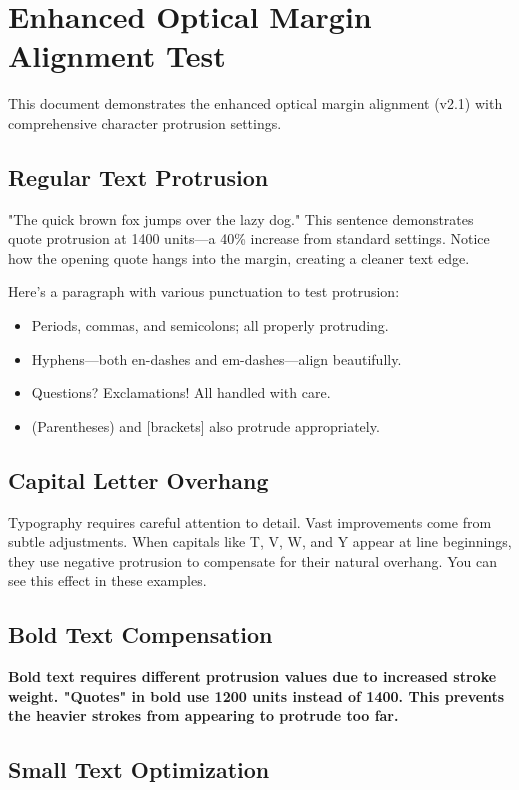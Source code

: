 \documentclass{article}
\begin{document}
\section{Enhanced Optical Margin Alignment Test}

This document demonstrates the enhanced optical margin alignment (v2.1) with comprehensive character protrusion settings.

\subsection{Regular Text Protrusion}

"The quick brown fox jumps over the lazy dog." This sentence demonstrates quote protrusion at 1400 units---a 40\% increase from standard settings. Notice how the opening quote hangs into the margin, creating a cleaner text edge.

Here's a paragraph with various punctuation to test protrusion:
\begin{itemize}
\item Periods, commas, and semicolons; all properly protruding.
\item Hyphens---both en-dashes and em-dashes---align beautifully.
\item Questions? Exclamations! All handled with care.
\item (Parentheses) and [brackets] also protrude appropriately.
\end{itemize}

\subsection{Capital Letter Overhang}

Typography requires careful attention to detail. Vast improvements come from subtle adjustments. When capitals like T, V, W, and Y appear at line beginnings, they use negative protrusion to compensate for their natural overhang. You can see this effect in these examples.

\subsection{Bold Text Compensation}

\textbf{Bold text requires different protrusion values due to increased stroke weight. "Quotes" in bold use 1200 units instead of 1400. This prevents the heavier strokes from appearing to protrude too far.}

\subsection{Small Text Optimization}
\end{document}
